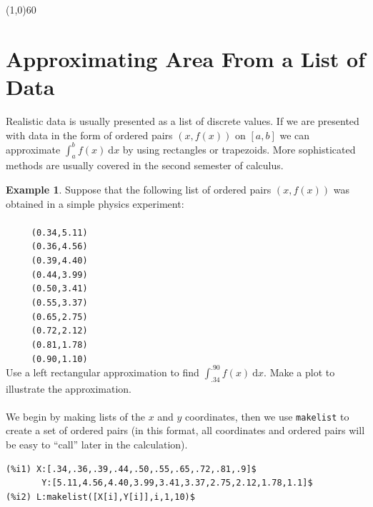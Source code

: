\documentclass[10.5pt,twoside]{report}
\theoremstyle{definition}
\newtheorem{exmp}{Example}[section]
\begin{document}
\line(1,0){60}
\linethickness{0.5mm}

\pagebreak

\section{Approximating Area From a List of Data}\label{Approximating Area From a List of Data}

Realistic data is usually presented as a list of discrete values.  If we are presented with data in the form of ordered pairs $(x,f(x))$ on $[a,b]$ we can approximate $\displaystyle \int_{a}^{b} f(x) \ \mathrm{d}x$ by using rectangles or trapezoids.  More sophisticated methods are usually covered in the second semester of calculus. 

\begin{exmp}  Suppose that the following list of ordered pairs $(x,f(x))$ was obtained in a simple physics experiment:  \\
${}$\\

\verb|     (0.34,5.11)|\\
\verb|     (0.36,4.56)|\\
\verb|     (0.39,4.40)|\\
\verb|     (0.44,3.99)|\\
\verb|     (0.50,3.41)|\\
\verb|     (0.55,3.37)|\\
\verb|     (0.65,2.75)|\\
\verb|     (0.72,2.12)|\\
\verb|     (0.81,1.78)|\\
\verb|     (0.90,1.10)|\\

Use a left rectangular approximation to find $\displaystyle \int_{.34}^{.90} f(x) \ \mathrm{d}x$.  Make a plot to illustrate the approximation.\\
${}$\\

We begin by making lists of the $x$ and $y$ coordinates, then we use \verb|makelist| to create a set of ordered pairs (in this format, all coordinates and ordered pairs will be easy to ``call'' later in the calculation).

\begin{verbatim}
(%i1) X:[.34,.36,.39,.44,.50,.55,.65,.72,.81,.9]$
       Y:[5.11,4.56,4.40,3.99,3.41,3.37,2.75,2.12,1.78,1.1]$
(%i2) L:makelist([X[i],Y[i]],i,1,10)$
\end{verbatim}


\end{exmp}
\end{document}
